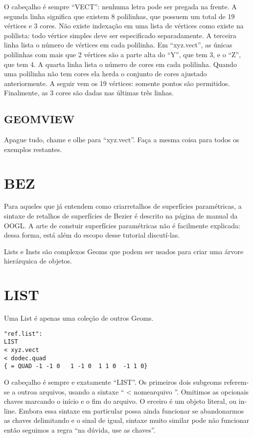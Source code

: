 \documentclass[12pt,a4paper]{book}
\begin{document}
O cabeçalho é sempre ``VECT'': nenhuma letra pode ser pregada na frente.
A segunda linha significa que existem 8 polilinhas, que possuem um total
de 19 vértices e 3 cores. Não existe indexação em uma lista de
vértices como existe na polilista: todo vértice simples deve ser especificado
separadamente. A terceira linha lista o número de vértices em cada
polilinha. Em ``xyz.vect'', as únicas polilinhas com mais que 2 vértices
são a parte alta do ``Y'', que tem 3, e o ``Z'', que tem 4.
A quarta linha lista o número de cores em cada polilinha.  Quando uma
polilinha não tem cores ela herda o conjunto de cores ajustado anteriormente.  A seguir
vem os 19 vértices: somente pontos são permitidos. Finalmente, as 3 cores
são dadas nas últimas três linhas.

\section{GEOMVIEW} 

Apague tudo, chame e olhe para ``xyz.vect''. Faça a mesma coisa para
todos os exemplos restantes.

\chapter{BEZ}

Para aqueles que já entendem como criarretalhos de superfícies
paramétricas, a sintaxe de retalhos de superfícies de Bezier é descrito na página de manual
da OOGL.  A arte de constuir superfícies paramétricas não é facilmente
explicada: dessa forma, está além do escopo desse tutorial discutí-las.

Lists e Insts são complexos Geoms que podem ser usados para criar uma
árvore hierárquica de objetos. 

\chapter{LIST}

Uma List é apenas uma coleção de outros Geoms.

\begin{verbatim}
"ref.list":
LIST
< xyz.vect
< dodec.quad
{ = QUAD -1 -1 0   1 -1 0  1 1 0  -1 1 0}
\end{verbatim}

O cabeçalho é sempre e exatamente ``LIST''. Os primeiros dois subgeoms referem-se a
outroa arquivos, usando a sintaxe `` < nomearquivo ''. Omitimos as
opcionais chaves marcando o início e o fim do arquivo.  O erceiro é um objeto literal,
ou in-line. Embora essa sintaxe em particular possa ainda funcionar se abandonarmos
as chaves delimitando e o sinal de igual, sintaxe muito similar pode
não funcionar então seguimos a regra ``na dúvida, use as chaves''.
\end{document}
